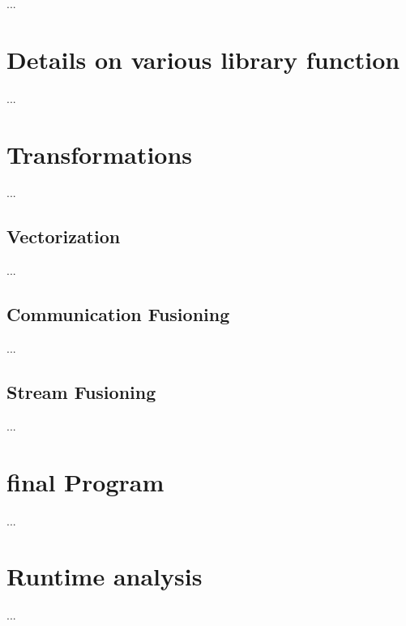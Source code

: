 

  ...
  
  \section{Details on various library function}
    ...
  \section{Transformations}
    ...
    \subsection{Vectorization}
      ...
    \subsection{Communication Fusioning}
      ...
    \subsection{Stream Fusioning}
      ...
      
  \section{final Program}
    ...
    
  \section{Runtime analysis}
    ...
    
    
